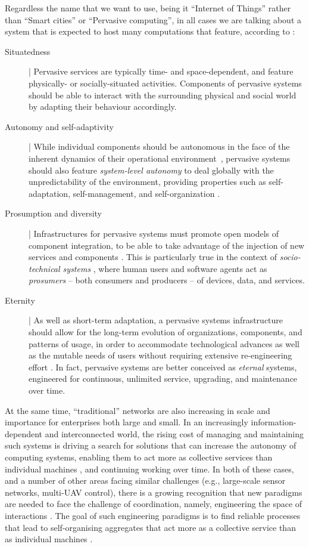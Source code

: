 \documentclass[12pt,a4paper,twoside,openright]{book}
\begin{document}
Regardless the name that we want to use, being it ``Internet of Things'' rather than ``Smart cities'' or ``Pervasive computing'', in all cases we are talking about a system that is expected to host many computations that feature, according to \cite{ker2014}:
\begin{description}
\item[Situatedness] | Pervasive services are typically time- and space-dependent, and feature physically- or socially-situated activities. Components of pervasive systems should be able to interact with the surrounding physical and social world by adapting their behaviour accordingly.
%
\item[Autonomy and self-adaptivity] | While individual components should be autonomous in the face of the inherent dynamics of their operational environment~\cite{agents-ieeecn6}, pervasive systems should also feature \emph{system-level autonomy} to deal globally with the unpredictability of the environment, providing properties such as self-adaptation, self-management, and self-organization \cite{Mam06}.
%
\item[Prosumption and diversity] | Infrastructures for pervasive systems must promote open models of component integration, to be able to take advantage of the injection of new services and components \cite{ZamO04}. This is particularly true in the context of \emph{socio-technical systems} \cite{interactioncomplexity-iccci2013}, where human users and software agents act as \emph{prosumers} -- both consumers and producers -- of devices, data, and services.
%
\item[Eternity] | As well as short-term adaptation, a pervasive systems infrastructure should allow for the long-term evolution of organizations, components, and patterns of usage, in order to accommodate technological advances as well as the mutable needs of users without requiring extensive re-engineering effort \cite{softwareevolution-iwpse2005}. In fact, pervasive systems are better conceived as \emph{eternal} systems, engineered for continuous, unlimited service, upgrading, and maintenance over time.
\end{description}

At the same time, ``traditional'' networks are also increasing in scale and importance for enterprises both large and small.
%
In an increasingly information-dependent and interconnected world, the rising cost of managing and maintaining such systems is driving a search for solutions that can increase the autonomy of computing systems, enabling them to act more as collective services than individual machines \cite{eze2012autonomic, hu2011cloudreview}, and continuing working over time.
%
In both of these cases, and a number of other areas facing similar challenges (e.g., large-scale sensor networks, multi-UAV control), there is a growing recognition that new paradigms are needed to face the challenge of coordination, namely, engineering the space of interactions \cite{Wegner}.
%
The goal of such engineering paradigms is to find reliable processes that lead to self-organising aggregates that act more as a collective service than as individual machines \cite{Cabri03,Bis11,Social12,PSC13}.
\end{document}
